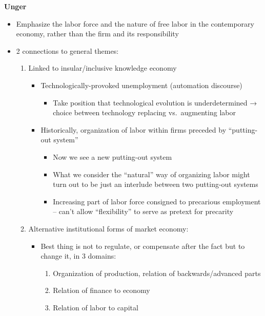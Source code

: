 \textbf{Unger}

\begin{itemize}
\tightlist
\item
  Emphasize the labor force and the nature of free labor in the
  contemporary economy, rather than the firm and its responsibility
\item
  2 connections to general themes:

  \begin{enumerate}
  \def\labelenumi{\arabic{enumi}.}
  \tightlist
  \item
    Linked to insular/inclusive knowledge economy

    \begin{itemize}
    \tightlist
    \item
      Technologically-provoked unemployment (automation discourse)

      \begin{itemize}
      \tightlist
      \item
        Take position that technological evolution is underdetermined →
        choice between technology replacing vs.~augmenting labor
      \end{itemize}
    \item
      Historically, organization of labor within firms preceded by
      ``putting-out system''

      \begin{itemize}
      \tightlist
      \item
        Now we see a new putting-out system
      \item
        What we consider the ``natural'' way of organizing labor might
        turn out to be just an interlude between two putting-out systems
      \item
        Increasing part of labor force consigned to precarious
        employment -- can't allow ``flexibility'' to serve as pretext
        for precarity
      \end{itemize}
    \end{itemize}
  \item
    Alternative institutional forms of market economy:

    \begin{itemize}
    \tightlist
    \item
      Best thing is not to regulate, or compensate after the fact but to
      change it, in 3 domains:

      \begin{enumerate}
      \def\labelenumii{\arabic{enumii}.}
      \tightlist
      \item
        Organization of production, relation of backwards/advanced parts
      \item
        Relation of finance to economy
      \item
        Relation of labor to capital
      \end{enumerate}
    \end{itemize}
  \end{enumerate}
\end{itemize}

